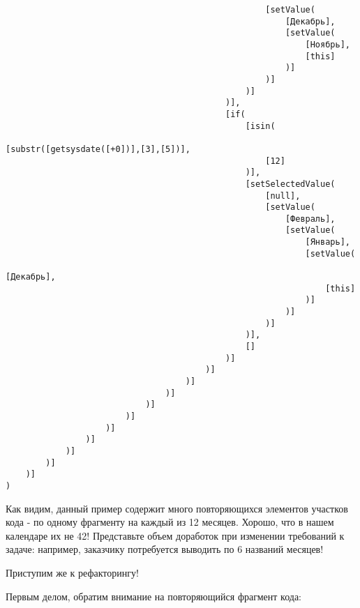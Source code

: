 \documentclass[../index.tex]{subfiles}
\begin{document}
\begin{verbatim}
                                                    [setValue(
                                                        [Декабрь],
                                                        [setValue(
                                                            [Ноябрь],
                                                            [this]
                                                        )]
                                                    )]
                                                )]
                                            )],
                                            [if(
                                                [isin(
                                                    [substr([getsysdate([+0])],[3],[5])],
                                                    [12]
                                                )],
                                                [setSelectedValue(
                                                    [null],
                                                    [setValue(
                                                        [Февраль],
                                                        [setValue(
                                                            [Январь],
                                                            [setValue(
                                                                [Декабрь],
                                                                [this]
                                                            )]
                                                        )]
                                                    )]
                                                )],
                                                []
                                            )]
                                        )]
                                    )]
                                )]
                            )]
                        )]
                    )]
                )]
            )]
        )]
    )]
)
\end{verbatim}

Как видим, данный пример содержит много повторяющихся элементов участков кода - по одному фрагменту на каждый из 12 месяцев. Хорошо, что в нашем календаре их не 42! Представьте объем доработок при изменении требований к задаче: например, заказчику потребуется выводить по 6 названий месяцев!

Приступим же к рефакторингу!

Первым делом, обратим внимание на повторяющийся фрагмент кода:
\end{document}
